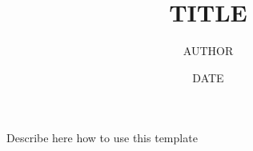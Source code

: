 \documentclass[12pt]{article}
\theoremstyle{nonumberbreak}
\begin{document}

\title{ TITLE }
\author{ AUTHOR }
\date{ DATE }
\maketitle
\thispagestyle{empty}

\tableofcontents

\setlength{\parindent}{0pt}

Describe here how to use this template





\end{document}
